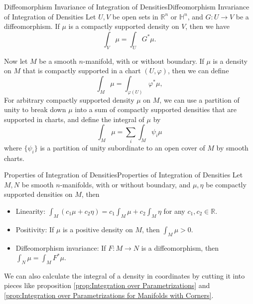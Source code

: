 \documentclass[../main.tex]{subfiles}
\begin{document}
\begin{proposition}{Diffeomorphism Invariance of Integration of Densities}{Diffeomorphism Invariance of Integration of Densities}
  Let $U,V$ be open sets in $\mathbb{R}^n$ or $\mathbb{H}^n$, and $G: U \to V$ be a diffeomorphism. If $\mu$ is a compactly supported density on $V$, then we have
  \begin{equation*}
    \int_V \mu = \int_U G^* \mu.
  \end{equation*}
\end{proposition}

Now let $M$ be a smooth $n$-manifold, with or without boundary. If $\mu$ is a density on $M$ that is compactly supported in a chart $(U,\varphi)$, then we can define
\begin{equation*}
  \int_M \mu = \int_{\varphi(U)} \varphi^* \mu,
\end{equation*}
For arbitrary compactly supported density $\mu$ on $M$, we can use a partition of unity to break down $\mu$ into a sum of compactly supported densities that are supported in charts, and define the integral of $\mu$ by
\begin{equation*}
  \int_M \mu = \sum_i \int_M \psi_i \mu
\end{equation*}
where $\{\psi_i\}$ is a partition of unity subordinate to an open cover of $M$ by smooth charts.

\begin{proposition}{Properties of Integration of Densities}{Properties of Integration of Densities}
  Let $M, N$ be smooth $n$-manifolds, with or without boundary, and $\mu, \eta$ be compactly supported densities on $M$, then
  \begin{itemize}
    \item Linearity: $\displaystyle \int_M (c_1 \mu + c_2 \eta) = c_1 \int_M \mu + c_2 \int_M \eta$ for any $c_1, c_2 \in \mathbb{R}$.
    \item Positivity: If $\mu$ is a positive density on $M$, then $\displaystyle \int_M \mu > 0$.
    \item Diffeomorphism invariance: If $F: M \to N$ is a diffeomorphism, then $\displaystyle \int_N \mu = \int_M F^* \mu$.
  \end{itemize}
\end{proposition}

We can also calculate the integral of a density in coordinates by cutting it into pieces like proposition \ref{prop:Integration over Parametrizations} and \ref{prop:Integration over Parametrizations for Manifolds with Corners}.
\end{document}
